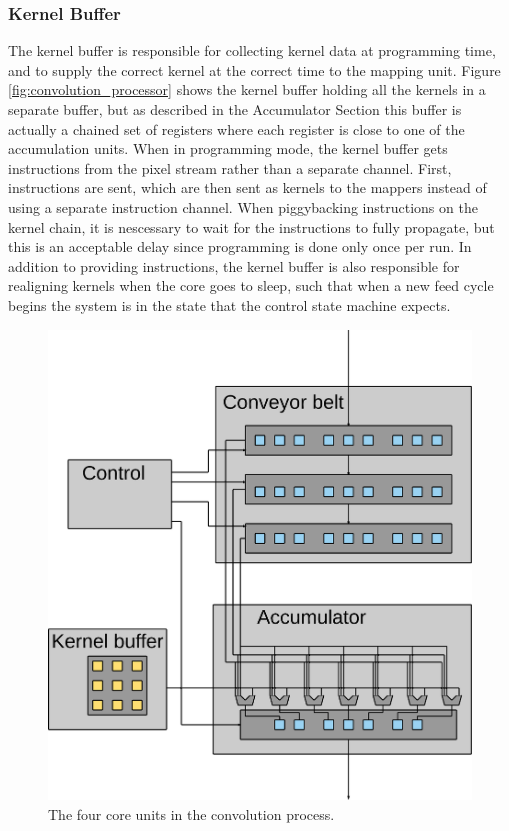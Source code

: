 \subsubsection{Kernel Buffer}
The kernel buffer is responsible for collecting kernel data at programming time, and to supply the correct kernel at the correct time to the mapping unit.
Figure \ref{fig:convolution_processor} shows the kernel buffer holding all the kernels in a separate buffer, but as described in the Accumulator Section this buffer is actually a chained set of registers where each register is close to one of the accumulation units.
When in programming mode, the kernel buffer gets instructions from the pixel stream rather than a separate channel.
First, instructions are sent, which are then sent as kernels to the mappers instead of using a separate instruction channel.
When piggybacking instructions on the kernel chain, it is nescessary to wait for the instructions to fully propagate, but this is an acceptable delay since programming is done only once per run.
In addition to providing instructions, the kernel buffer is also responsible for realigning kernels when the core goes to sleep, such that when a new feed cycle begins the system is in the state that the control state machine expects.


\begin{figure}[h!]
    \includegraphics[width=\linewidth]{img/processor_overview_small.png}
    \caption{The four core units in the convolution process.}
    \label{fig:processor_core}
\end{figure}


